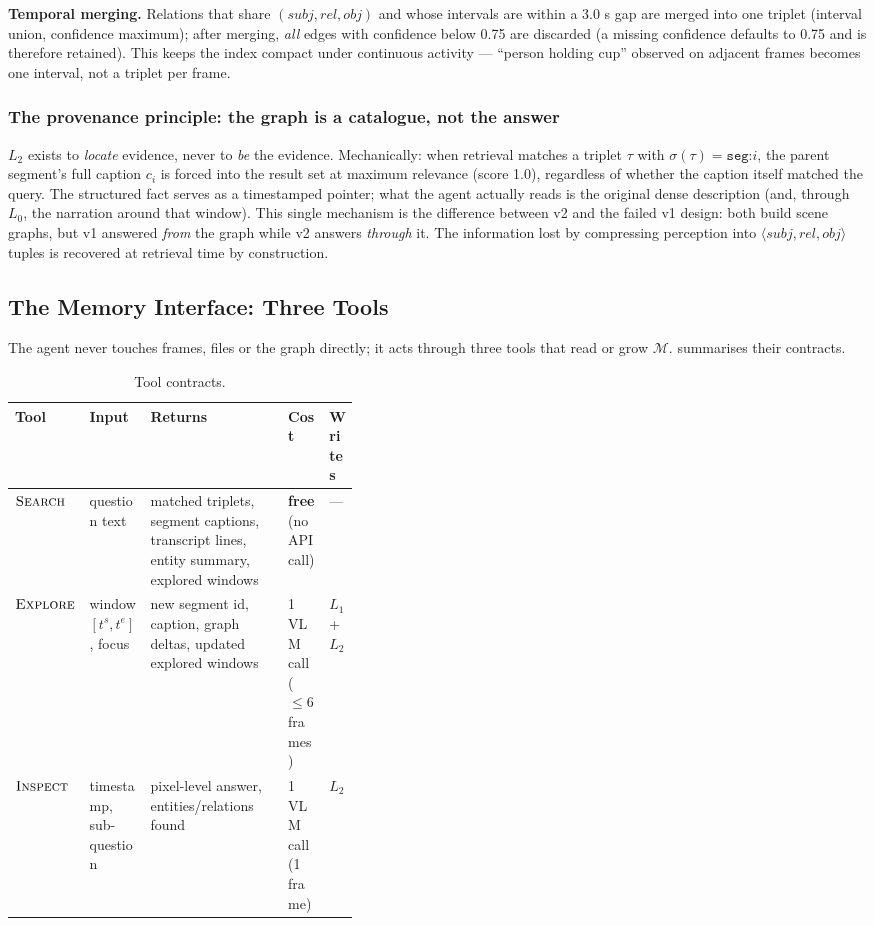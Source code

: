 \textbf{Temporal merging.} Relations that share $(\mathit{subj}, \mathit{rel}, \mathit{obj})$ and whose
intervals are within a 3.0 s gap are merged into one triplet (interval union, confidence maximum);
after merging, \emph{all} edges with confidence below 0.75 are discarded (a missing confidence defaults
to 0.75 and is therefore retained). This keeps the index compact under continuous
activity --- ``person holding cup'' observed on adjacent frames becomes one interval, not a triplet
per frame.

\subsubsection{The provenance principle: the graph is a catalogue, not the answer}
\label{subsubsec:provenance}

$L_2$ exists to \emph{locate} evidence, never to \emph{be} the evidence. Mechanically: when retrieval
matches a triplet $\tau$ with $\sigma(\tau) = \texttt{seg:}i$, the parent segment's full caption
$c_i$ is forced into the result set at maximum relevance (score 1.0), regardless of whether the
caption itself matched the query. The structured fact serves as a timestamped pointer; what the
agent actually reads is the original dense description (and, through $L_0$, the narration around
that window). This single mechanism is the difference between v2 and the failed v1 design: both
build scene graphs, but v1 answered \emph{from} the graph while v2 answers \emph{through} it. The
information lost by compressing perception into $\langle \mathit{subj}, \mathit{rel},
\mathit{obj}\rangle$ tuples is recovered at retrieval time by construction.

\subsection{The Memory Interface: Three Tools}
\label{subsec:tools}

The agent never touches frames, files or the graph directly; it acts through three tools that
read or grow $\mathcal{M}$.  summarises their contracts.

\begin{table}[t]
  \centering
  \small
  \caption{Tool contracts.}
  \label{tab:tools}
  \setlength{\tabcolsep}{4.5pt}
  \begin{tabular}{@{}llp{0.40\linewidth}ll@{}}
    \toprule
    Tool & Input & Returns & Cost & Writes \\
    \midrule
    $\textsc{Search}$ & question text & matched triplets, segment captions, transcript lines, entity summary, explored windows & \textbf{free} (no API call) & --- \\
    $\textsc{Explore}$ & window $[t^{s}, t^{e}]$, focus & new segment id, caption, graph deltas, updated explored windows & 1 VLM call ($\leq 6$ frames) & $L_1$ + $L_2$ \\
    $\textsc{Inspect}$ & timestamp, sub-question & pixel-level answer, entities/relations found & 1 VLM call (1 frame) & $L_2$ \\
    \bottomrule
  \end{tabular}
\end{table}

